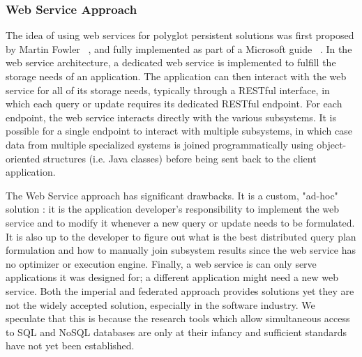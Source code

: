 \subsubsection{Web Service Approach}

The idea of using web services for polyglot persistent solutions was first proposed by Martin Fowler ~\cite{Fowler2012}, and fully implemented as part of a Microsoft guide ~\cite{Sharp2013}. In the web service architecture, a dedicated web service is implemented to fulfill the storage needs of an application.  The application can then interact with the web service for all of its storage needs, typically through a RESTful interface, in which each query or update requires its dedicated RESTful endpoint. For each endpoint, the web service interacts directly with the various subsystems. It is possible for a single endpoint to interact with multiple subsystems, in which case data from multiple specialized systems is joined programmatically using object-oriented structures (i.e. Java classes) before being sent back to the client application.

The Web Service approach has significant drawbacks. It is a custom, "ad-hoc" solution : it is the application developer's responsibility to implement  the web service and to modify it whenever a new query or update needs to be formulated. It is also up to the developer to figure out what is the best distributed query plan formulation and how to manually join subsystem results since the web service has no optimizer or execution engine. Finally, a web service is can only serve applications it was designed for; a different application might need a new web service. Both the imperial and federated approach provides solutions yet they are not the widely accepted solution, especially in the software industry. We speculate that this is because the research tools which allow simultaneous access to SQL and NoSQL databases are only at their infancy and sufficient standards have not yet been established.



